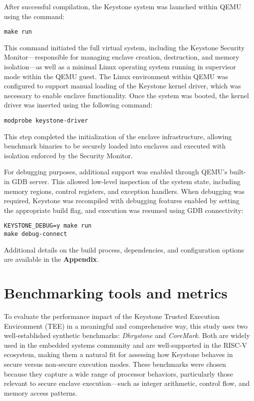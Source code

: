 After successful compilation, the Keystone system was launched within QEMU using the command:

\begin{verbatim}
make run
\end{verbatim}

This command initiated the full virtual system, including the Keystone Security Monitor—responsible for managing enclave creation, destruction, and memory isolation—as well as a minimal Linux operating system running in supervisor mode within the QEMU guest. The Linux environment within QEMU was configured to support manual loading of the Keystone kernel driver, which was necessary to enable enclave functionality. Once the system was booted, the kernel driver was inserted using the following command:

\begin{verbatim}
modprobe keystone-driver
\end{verbatim}

This step completed the initialization of the enclave infrastructure, allowing benchmark binaries to be securely loaded into enclaves and executed with isolation enforced by the Security Monitor.

For debugging purposes, additional support was enabled through QEMU’s built-in GDB server. This allowed low-level inspection of the system state, including memory regions, control registers, and exception handlers. When debugging was required, Keystone was recompiled with debugging features enabled by setting the appropriate build flag, and execution was resumed using GDB connectivity:

\begin{verbatim}
KEYSTONE_DEBUG=y make run
make debug-connect
\end{verbatim}

Additional details on the build process, dependencies, and configuration options are available in the \textbf{Appendix}.

\section{Benchmarking tools and metrics}

To evaluate the performance impact of the Keystone Trusted Execution Environment (TEE) in a meaningful and comprehensive way, this study uses two well-established synthetic benchmarks: \textit{Dhrystone} and \textit{CoreMark}. Both are widely used in the embedded systems community and are well-supported in the RISC-V ecosystem, making them a natural fit for assessing how Keystone behaves in secure versus non-secure execution modes. These benchmarks were chosen because they capture a wide range of processor behaviors, particularly those relevant to secure enclave execution—such as integer arithmetic, control flow, and memory access patterns.


